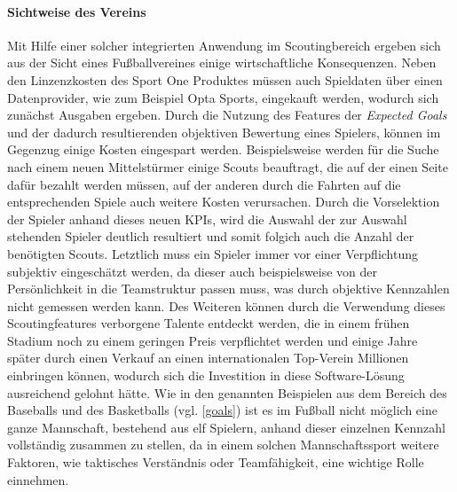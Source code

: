 \paragraph{Sichtweise des Vereins}
Mit Hilfe einer solcher integrierten Anwendung im Scoutingbereich ergeben sich aus der Sicht eines Fußballvereines einige wirtschaftliche Konsequenzen. Neben den Linzenzkosten des Sport One Produktes müssen auch Spieldaten über einen Datenprovider, wie zum Beispiel Opta Sports, eingekauft werden, wodurch sich zunächst Ausgaben ergeben. Durch die Nutzung des Features der \textit{Expected Goals} und der dadurch resultierenden objektiven Bewertung eines Spielers, können im Gegenzug einige Kosten eingespart werden. Beispielsweise werden für die Suche nach einem neuen Mittelstürmer einige Scouts beauftragt, die auf der einen Seite dafür bezahlt werden müssen, auf der anderen durch die Fahrten auf die entsprechenden Spiele auch weitere Kosten verursachen. Durch die Vorselektion der Spieler anhand dieses neuen KPIs, wird die Auswahl der zur Auswahl stehenden Spieler deutlich resultiert und somit folgich auch die Anzahl der benötigten Scouts. Letztlich muss ein Spieler immer vor einer Verpflichtung subjektiv eingeschätzt werden, da dieser auch beispielsweise von der Persönlichkeit in die Teamstruktur passen muss, was durch objektive Kennzahlen nicht gemessen werden kann. Des Weiteren können durch die Verwendung dieses Scoutingfeatures verborgene Talente entdeckt werden, die in einem frühen Stadium noch zu einem geringen Preis verpflichtet werden und einige Jahre später durch einen Verkauf an einen internationalen Top-Verein Millionen einbringen können, wodurch sich die Investition in diese Software-Lösung ausreichend gelohnt hätte. Wie in den genannten Beispielen aus dem Bereich des Baseballs und des Basketballs (vgl. \vref{goals}) ist es im Fußball nicht möglich eine ganze Mannschaft, bestehend aus elf Spielern, anhand dieser einzelnen Kennzahl vollständig zusammen zu stellen, da in einem solchen Mannschaftssport weitere Faktoren, wie taktisches Verständnis oder Teamfähigkeit, eine wichtige Rolle einnehmen. 